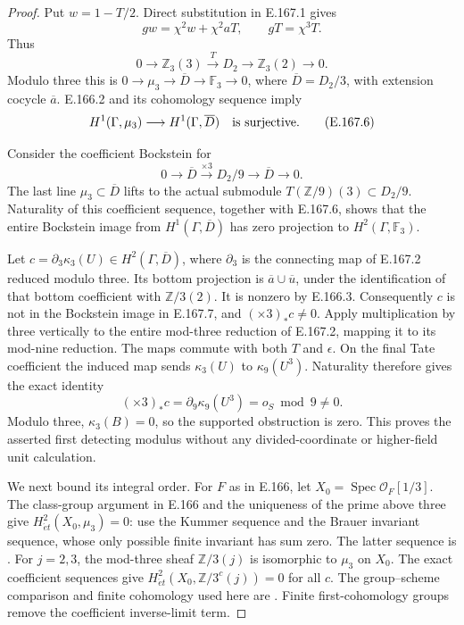 \begin{proof}
Put \(w=1-T/2\).  Direct substitution in E.167.1 gives
\[
 gw=\chi^2w+\chi^2aT,\qquad gT=\chi^3T.
\tag{E.167.4}
\]
Thus
\[
 0\to\mathbb Z_3(3)\xrightarrow{\ T\ }D_2
       \to\mathbb Z_3(2)\to0.
\tag{E.167.5}
\]
Modulo three this is \(0\to\mu_3\to\overline D\to\mathbb F_3\to0\),
where \(\overline D=D_2/3\), with extension cocycle
\(\overline a\).  E.166.2 and its cohomology sequence imply
\[
 H^1(\Gamma,\mu_3)\longrightarrow H^1(\Gamma,\overline D)
                         \quad\hbox{is surjective}.
\tag{E.167.6}
\]

Consider the coefficient Bockstein for
\[
 0\to\overline D\xrightarrow{\times3}D_2/9
                      \longrightarrow\overline D\to0.
\tag{E.167.7}
\]
The last line \(\mu_3\subset\overline D\) lifts to the actual
submodule \(T(\mathbb Z/9)(3)\subset D_2/9\).  Naturality of this
coefficient sequence, together with E.167.6, shows that the entire
Bockstein image from \(H^1(\Gamma,\overline D)\) has zero
projection to \(H^2(\Gamma,\mathbb F_3)\).

Let \(c=\partial_3\kappa_3(U)\in
H^2(\Gamma,\overline D)\), where \(\partial_3\) is the
connecting map of E.167.2 reduced modulo three.  Its bottom
projection is \(\overline a\cup\overline u\), under the
identification of that bottom coefficient with \(\mathbb Z/3(2)\).
It is nonzero by E.166.3.  Consequently \(c\) is not in the
Bockstein image in E.167.7, and
\((\times3)_*c\ne0\).  Apply multiplication by three vertically
to the entire mod-three reduction of E.167.2, mapping it to its
mod-nine reduction.  The maps commute with both \(T\) and
\(\epsilon\).  On the final Tate coefficient the induced map
sends \(\kappa_3(U)\) to \(\kappa_9(U^3)\).  Naturality therefore
gives the exact identity
\[
 (\times3)_*c=\partial_9\kappa_9(U^3)=o_S\bmod9\ne0.
\tag{E.167.8}
\]
Modulo three, \(\kappa_3(B)=0\), so the supported obstruction
is zero.  This proves the asserted first detecting modulus without
any divided-coordinate or higher-field unit calculation.

We next bound its integral order.  For \(F\) as in E.166, let
\(X_0=\operatorname{Spec}\mathcal O_F[1/3]\).
The class-group argument in E.166 and the uniqueness of the prime
above three give
\(H^2_{\acute et}(X_0,\mu_3)=0\): use the Kummer sequence
and the Brauer invariant sequence, whose only possible finite
invariant has sum zero.  The latter sequence is
\cite[II, Proposition 2.1, pp.~163--164]{CohMilneADT}.
For \(j=2,3\), the mod-three sheaf \(\mathbb Z/3(j)\) is isomorphic
to \(\mu_3\) on \(X_0\).  The exact coefficient sequences give
\(H^2_{\acute et}(X_0,\mathbb Z/3^c(j))=0\) for all \(c\).
The group--scheme comparison and finite cohomology used here are
\cite[II, Proposition 2.9, pp.~170--172; I, Corollary 4.15,
p.~62]{CohMilneADT}.  Finite first-cohomology groups remove the
coefficient inverse-limit term.


\end{proof}
